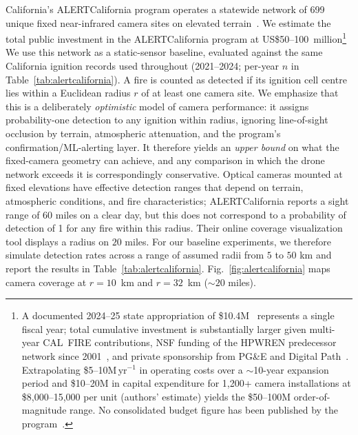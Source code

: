 \documentclass[pdflatex,sn-mathphys-num]{sn-jnl}%
\theoremstyle{thmstyleone}%
\theoremstyle{thmstyletwo}%
\theoremstyle{thmstylethree}%
\begin{document}
\noindent California's ALERTCalifornia program operates a statewide network of 699 unique fixed near-infrared camera sites on elevated terrain~\cite{alertcalifornia2026}. We estimate the total public investment in the ALERTCalifornia program at US\$50--100~million\footnote{A documented 2024--25 state appropriation of \$10.4M~\cite{california_ab108_2024,
govtech_insider_calfire_ucsd_2024} represents a single fiscal year; total
cumulative investment is substantially larger given multi-year CAL~FIRE
contributions, NSF funding of the HPWREN predecessor network since
2001~\cite{alertcalifornia_history}, and private sponsorship from PG\&E and
Digital Path~\cite{alertcalifornia_time2023}. Extrapolating \$5--10M\,yr$^{-1}$
in operating costs over a $\sim$10-year expansion period and \$10--20M in
capital expenditure for 1,200+ camera installations at \$8,000--15,000 per unit
(authors' estimate) yields the \$50--100M order-of-magnitude range. No
consolidated budget figure has been published by the
program~\cite{alertcalifornia2026}.}
We use this network as a static-sensor baseline, evaluated against the same California ignition records used throughout (2021--2024; per-year $n$ in Table~\ref{tab:alertcalifornia}). A fire is counted as detected if its ignition cell centre lies within a Euclidean radius $r$ of at least one camera site. We emphasize that this is a deliberately \emph{optimistic} model of camera performance: it assigns probability-one detection to any ignition within radius, ignoring line-of-sight occlusion by terrain, atmospheric attenuation, and the program's confirmation/ML-alerting layer. It therefore yields an \emph{upper bound} on what the fixed-camera geometry can achieve, and any comparison in which the drone network exceeds it is correspondingly conservative. Optical cameras mounted at fixed elevations have effective detection ranges that depend on terrain, atmospheric conditions, and fire characteristics; ALERTCalifornia reports a sight range of $60$ miles on a clear day, but this does not correspond to a probability of detection of 1 for any fire within this radius. Their online coverage visualization tool displays a radius on $20$ miles. For our baseline experiments, we therefore simulate detection rates across a range of assumed radii from $5$ to $50$ km and report the results in Table~\ref{tab:alertcalifornia}. Fig.~\ref{fig:alertcalifornia} maps camera coverage at $r = 10$~km and $r = 32$~km ($\sim20$ miles).



\end{document}
